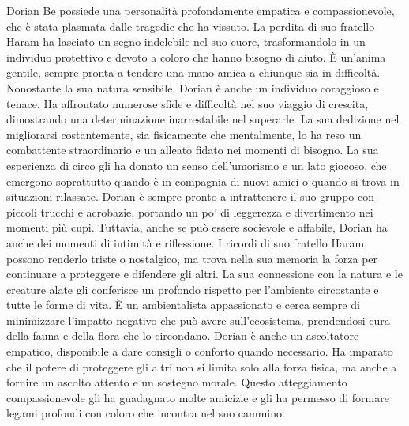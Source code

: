 Dorian Be possiede una personalità profondamente empatica e
compassionevole, che è stata plasmata dalle tragedie che ha vissuto. La
perdita di suo fratello Haram ha lasciato un segno indelebile nel suo
cuore, trasformandolo in un individuo protettivo e devoto a coloro che
hanno bisogno di aiuto. È un'anima gentile, sempre pronta a tendere una
mano amica a chiunque sia in difficoltà. Nonostante la sua natura
sensibile, Dorian è anche un individuo coraggioso e tenace. Ha
affrontato numerose sfide e difficoltà nel suo viaggio di crescita,
dimostrando una determinazione inarrestabile nel superarle. La sua
dedizione nel migliorarsi costantemente, sia fisicamente che
mentalmente, lo ha reso un combattente straordinario e un alleato fidato
nei momenti di bisogno. La sua esperienza di circo gli ha donato un
senso dell'umorismo e un lato giocoso, che emergono soprattutto quando è
in compagnia di nuovi amici o quando si trova in situazioni rilassate.
Dorian è sempre pronto a intrattenere il suo gruppo con piccoli trucchi
e acrobazie, portando un po' di leggerezza e divertimento nei momenti
più cupi. Tuttavia, anche se può essere socievole e affabile, Dorian ha
anche dei momenti di intimità e riflessione. I ricordi di suo fratello
Haram possono renderlo triste o nostalgico, ma trova nella sua memoria
la forza per continuare a proteggere e difendere gli altri. La sua
connessione con la natura e le creature alate gli conferisce un profondo
rispetto per l'ambiente circostante e tutte le forme di vita. È un
ambientalista appassionato e cerca sempre di minimizzare l'impatto
negativo che può avere sull'ecosistema, prendendosi cura della fauna e
della flora che lo circondano. Dorian è anche un ascoltatore empatico,
disponibile a dare consigli o conforto quando necessario. Ha imparato
che il potere di proteggere gli altri non si limita solo alla forza
fisica, ma anche a fornire un ascolto attento e un sostegno morale.
Questo atteggiamento compassionevole gli ha guadagnato molte amicizie e
gli ha permesso di formare legami profondi con coloro che incontra nel
suo cammino.

